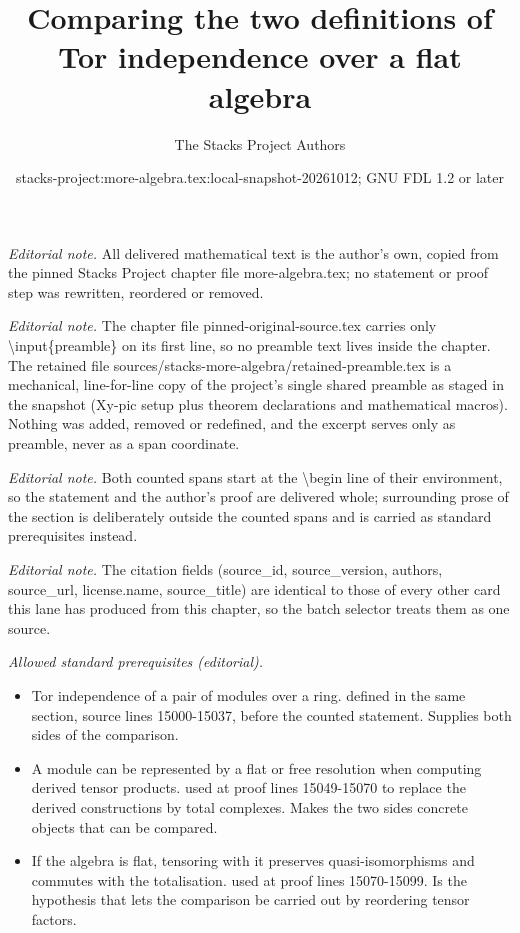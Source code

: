 \documentclass[10pt,a4paper]{amsart}
\title{Comparing the two definitions of Tor independence over a flat algebra}
\author{The Stacks Project Authors}
\date{stacks-project:more-algebra.tex:local-snapshot-20261012; GNU FDL 1.2 or later}
\theoremstyle{plain}
\theoremstyle{definition}
\theoremstyle{remark}
\numberwithin{equation}{subsection}
\begin{document}
\maketitle
\setcounter{subsection}{1}
\noindent\textit{Editorial note.} All delivered mathematical text is the author's own, copied from the pinned Stacks Project chapter file more-algebra.tex; no statement or proof step was rewritten, reordered or removed.\par\medskip
\noindent\textit{Editorial note.} The chapter file pinned-original-source.tex carries only \textbackslash{}input\{preamble\} on its first line, so no preamble text lives inside the chapter. The retained file sources/stacks-more-algebra/retained-preamble.tex is a mechanical, line-for-line copy of the project's single shared preamble as staged in the snapshot (Xy-pic setup plus theorem declarations and mathematical macros). Nothing was added, removed or redefined, and the excerpt serves only as preamble, never as a span coordinate.\par\medskip
\noindent\textit{Editorial note.} Both counted spans start at the \textbackslash{}begin line of their environment, so the statement and the author's proof are delivered whole; surrounding prose of the section is deliberately outside the counted spans and is carried as standard prerequisites instead.\par\medskip
\noindent\textit{Editorial note.} The citation fields (source\_id, source\_version, authors, source\_url, license.name, source\_title) are identical to those of every other card this lane has produced from this chapter, so the batch selector treats them as one source.\par\medskip
\noindent\textit{Allowed standard prerequisites (editorial).}\begin{itemize}
\item Tor independence of a pair of modules over a ring. defined in the same section, source lines 15000-15037, before the counted statement. Supplies both sides of the comparison.
\item A module can be represented by a flat or free resolution when computing derived tensor products. used at proof lines 15049-15070 to replace the derived constructions by total complexes. Makes the two sides concrete objects that can be compared.
\item If the algebra is flat, tensoring with it preserves quasi-isomorphisms and commutes with the totalisation. used at proof lines 15070-15099. Is the hypothesis that lets the comparison be carried out by reordering tensor factors.
\end{itemize}\medskip
\end{document}
